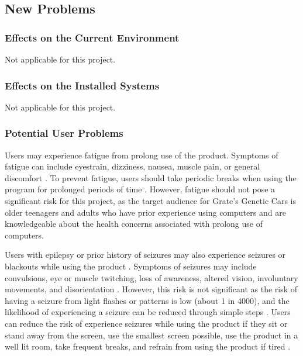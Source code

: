\documentclass[12pt, titlepage]{article}
\begin{document}
\subsection{New Problems}

\subsubsection{Effects on the Current Environment}
Not applicable for this project.

\subsubsection{Effects on the Installed Systems}
Not applicable for this project.

\subsubsection{Potential User Problems}
Users may experience fatigue from prolong use of the product. Symptoms of 
fatigue can include eyestrain, dizziness, nausea, muscle pain, or general 
discomfort \citep{nintendo}. To prevent fatigue, users should take periodic 
breaks when using the 
program for prolonged periods of time \citep{nintendo}. However, fatigue should 
not pose a 
significant risk for this project, as the target audience for Grate's Genetic 
Cars is older teenagers and adults who have prior experience using computers and 
are  knowledgeable about the health concerns associated with prolong use of 
computers.

Users with epilepsy or prior history of seizures may also experience seizures or 
blackouts while using the product \citep{nintendo}. Symptoms of seizures may 
include convulsions, 
eye or muscle twitching, loss of awareness, altered vision, involuntary 
movements, and disorientation \citep{nintendo}. However, this risk is not 
significant as the risk 
of having a seizure from light flashes or patterns is low (about 1 in 4000), and 
the likelihood of experiencing a seizure can be reduced through simple steps 
\citep{nintendo}. 
Users can reduce the risk of experience seizures while using the product if they 
sit or stand away from the screen, use the smallest screen possible, use the 
product in a well lit room, take frequent breaks, and refrain from using the 
product if tired \citep{nintendo}.
\end{document}
